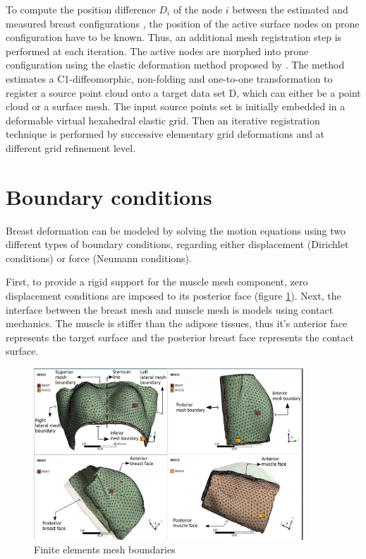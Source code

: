 To compute the position difference $D_i$ of the node $i$ between the estimated and measured breast configurations , the  position of the active surface nodes on prone configuration have to be known. Thus, an additional mesh registration step is performed at each iteration. The active nodes are morphed into prone configuration using the elastic deformation method proposed by \cite{bucki_fast_2010}. The method estimates a C1-diffeomorphic, non-folding and one-to-one transformation to register a source point cloud onto a target data set D, which can either be a point cloud or a surface mesh.  The input source points set is initially embedded in a deformable virtual hexahedral elastic grid. Then an iterative registration technique is performed by successive elementary grid deformations and at different grid refinement level. 

\section{Boundary conditions}\label{section:myBoundayconditions}

Breast deformation can be modeled by solving the
motion equations using two different types of boundary
conditions, regarding either displacement (Dirichlet conditions) or force (Neumann conditions).

First, to provide a rigid support for the muscle mesh component, zero displacement conditions are imposed to its posterior face (figure \ref{fig:meshboundaries}). Next, the interface between the breast mesh and muscle mesh is models using contact mechanics. The muscle is stiffer than the adipose tissues, thus it's anterior face represents the target surface and the posterior breast face represents the contact surface. 

\begin{figure}[!h]
\centering
\includegraphics[width=0.9\textwidth,keepaspectratio]{figures/mesh_parts_2.png} 
\caption{Finite elements mesh boundaries}\label{fig:meshboundaries}
\end{figure}

